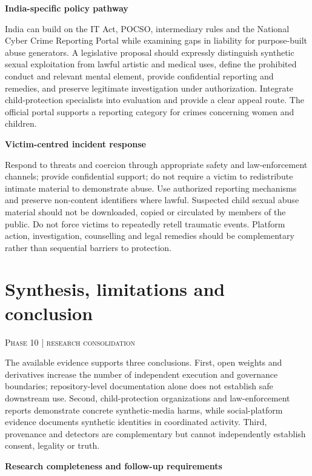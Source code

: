 \documentclass[10pt,a4paper]{article}
\newcommand{\sect}[2]{\Needspace{6\baselineskip}\section{#1}\textcolor{muted}{\small\textsc{#2}}\par\vspace{2mm}}
\newcommand{\sub}[1]{\vspace{1mm}\textbf{#1}\par}
\begin{document}
\sub{India-specific policy pathway}
India can build on the IT Act, POCSO, intermediary rules and the National Cyber Crime Reporting Portal while examining gaps in liability for purpose-built abuse generators. A legislative proposal should expressly distinguish synthetic sexual exploitation from lawful artistic and medical uses, define the prohibited conduct and relevant mental element, provide confidential reporting and remedies, and preserve legitimate investigation under authorization. Integrate child-protection specialists into evaluation and provide a clear appeal route. The official portal supports a reporting category for crimes concerning women and children. \cite{itact,pocso,india,indiareport}

\sub{Victim-centred incident response}
Respond to threats and coercion through appropriate safety and law-enforcement channels; provide confidential support; do not require a victim to redistribute intimate material to demonstrate abuse. Use authorized reporting mechanisms and preserve non-content identifiers where lawful. Suspected child sexual abuse material should not be downloaded, copied or circulated by members of the public. Do not force victims to repeatedly retell traumatic events. Platform action, investigation, counselling and legal remedies should be complementary rather than sequential barriers to protection.

\sect{Synthesis, limitations and conclusion}{Phase 10 | research consolidation}

The available evidence supports three conclusions. First, open weights and derivatives increase the number of independent execution and governance boundaries; repository-level documentation alone does not establish safe downstream use. Second, child-protection organizations and law-enforcement reports demonstrate concrete synthetic-media harms, while social-platform evidence documents synthetic identities in coordinated activity. Third, provenance and detectors are complementary but cannot independently establish consent, legality or truth. \cite{hfcards,iwf,ncmec25,fbi,meta,nist,c2pa}


\sub{Research completeness and follow-up requirements}
\end{document}
